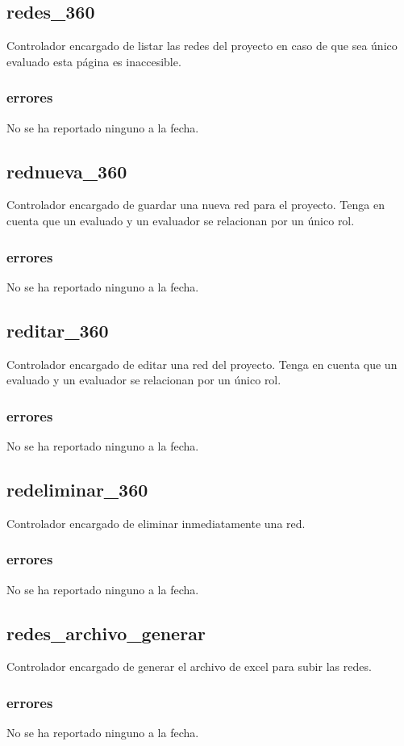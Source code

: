 \documentclass[10pt,a4paper]{book}
\begin{document}
	\subsection{redes\_360}
	Controlador encargado de listar las redes del proyecto en caso de que sea único evaluado esta página es inaccesible. 
	\subsubsection{errores}
	No se ha reportado ninguno a la fecha.
	
	\subsection{rednueva\_360}
	Controlador encargado de guardar una nueva red para el proyecto. Tenga en cuenta que un evaluado y un evaluador se relacionan por un único rol.
	\subsubsection{errores}
	No se ha reportado ninguno a la fecha.
	
	\subsection{reditar\_360}
	Controlador encargado de editar una red del proyecto. Tenga en cuenta que un evaluado y un evaluador se relacionan por un único rol.
	\subsubsection{errores}
	No se ha reportado ninguno a la fecha.
	
	\subsection{redeliminar\_360}
	Controlador encargado de eliminar inmediatamente una red.
	\subsubsection{errores}
	No se ha reportado ninguno a la fecha.
	
	\subsection{redes\_archivo\_generar}
	Controlador encargado de generar el archivo de excel para subir las redes.
	\subsubsection{errores}
	No se ha reportado ninguno a la fecha.
	
\end{document}
